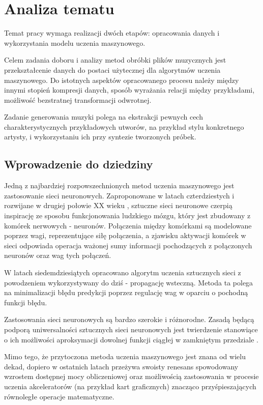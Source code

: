 \chapter{Analiza tematu}\label{chap:analysis}
{
  Temat pracy wymaga realizacji dwóch etapów: opracowania danych i wykorzystania modelu
  uczenia maszynowego.

  Celem zadania doboru i analizy metod obróbki plików muzycznych jest 
  przekształcenie danych do postaci użytecznej dla algorytmów uczenia maszynowego.
  Do istotnych aspektów opracowanego procesu należy między innymi stopień kompresji danych,
  sposób wyrażania relacji między przykładami, możliwość bezstratnej transformacji odwrotnej. 

  Zadanie generowania muzyki polega na ekstrakcji pewnych cech charakterystycznych
  przykładowych utworów, na przykład stylu konkretnego artysty, 
  i wykorzystaniu ich przy syntezie tworzonych próbek. 

  \section{Wprowadzenie do dziedziny}
  {
    Jedną z najbardziej rozpowszechnionych metod uczenia maszynowego jest zastosowanie sieci neuronowych.
    Zaproponowane w latach czterdziestych i rozwijane w drugiej połowie XX wieku \cite{McCulloch1943}, sztuczne sieci neuronowe
    czerpią inspirację ze sposobu funkcjonowania ludzkiego mózgu, który jest zbudowany z komórek nerwowych - neuronów.
    Połączenia między komórkami są modelowane poprzez wagi, reprezentujące siłę połączenia, a zjawisku aktywacji
    komórek w sieci odpowiada operacja ważonej sumy informacji pochodzących z połączonych neuronów oraz wag tych połączeń.
    
    W latach siedemdziesiątych opracowano algorytm uczenia sztucznych sieci z powodzeniem wykorzystywany
    do dziś - propagację wsteczną. Metoda ta polega na minimalizacji błędu predykcji poprzez regulację
    wag w oparciu o pochodną funkcji błędu.

    Zastosowania sieci neuronowych są bardzo szerokie i różnorodne. Zasadą będącą podporą uniwersalności 
    sztucznych sieci neuronowych jest twierdzenie stanowiące o ich możliwości aproksymacji dowolnej 
    funkcji ciągłej w zamkniętym przedziale \cite{Csji2001ApproximationWA}.

    Mimo tego, że przytoczona metoda uczenia maszynowego jest znana od wielu dekad, dopiero w ostatnich latach
    przeżywa swoisty renesans spowodowany wzrostem dostępnej mocy obliczeniowej oraz 
    możliwością zastosowania w procesie uczenia akceleratorów (na przykład kart graficznych) znacząco 
    przyśpieszających równoległe operacje matematyczne.


}}
